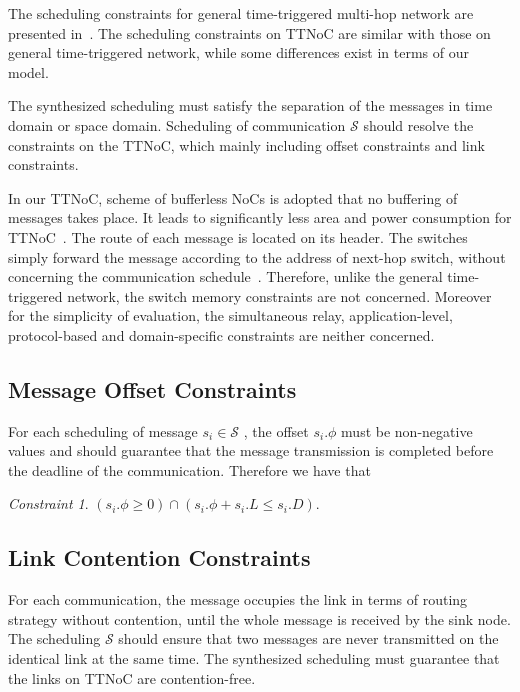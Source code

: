 \documentclass[journal]{IEEEtran}
\newcommand{\calS}{\mathcal{S}}
\theoremstyle{remark}
\newtheorem{constraint}{Constraint}
\begin{document}
The scheduling constraints for general time-triggered multi-hop
network are presented in~\cite{DBLP:conf/rtss/Steiner10}. The
scheduling constraints on TTNoC are similar with those on general
time-triggered network, while some differences exist in terms of our
model.

The synthesized scheduling must satisfy the separation
of the messages in time domain or space domain.
Scheduling of communication $\calS$ should resolve the constraints on
the TTNoC, which mainly including offset constraints and link constraints.

In our TTNoC, scheme of bufferless NoCs is adopted that no buffering
of messages takes place. It leads to significantly less area and
power consumption for TTNoC~\cite{DBLP:journals/tpds/ShpinerKLCK15}.
The route of each message is located on its header.  
The switches simply forward the message according to the address of next-hop
switch, without concerning the communication schedule~\cite{DBLP:conf/rtcsa/PaukovitsK08}. Therefore,
unlike the general time-triggered network, the switch memory
constraints are not concerned. Moreover for
the simplicity of evaluation,
the simultaneous relay,
application-level, protocol-based and domain-specific constraints are neither
concerned.

\subsection{Message Offset Constraints}
For each scheduling of message $s_{i}\in\calS$ , the offset $s_i.\phi$
must be non-negative values and should guarantee that the message
transmission is completed before the deadline of the
communication. Therefore we have that
\begin{constraint}
\label{c:offset}
$(s_i.\phi \geq 0) \cap (s_i.\phi + s_i.L \leq s_i.D)$.
\end{constraint}

\subsection{Link Contention Constraints}
For each communication, the message occupies the link in terms of
routing strategy without contention, until the whole message is
received by the sink node. The scheduling $\calS$ should ensure that
two messages are never transmitted on the identical link at the same
time. The synthesized scheduling must guarantee that the links on
TTNoC are contention-free.
\end{document}
